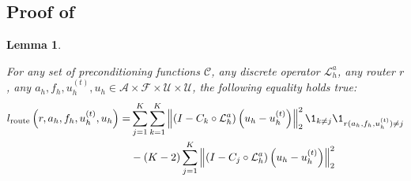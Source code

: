 \documentclass{article}
\newtheorem{lemma}[theorem]{Lemma}
\begin{document}
\subsection{Proof of } \label{sec:proofroutingequivalence}

\begin{lemma} \label{th:routingequivalence}

For any set of preconditioning functions $\mathcal{C}$, any discrete operator $\mathcal{L}_h^a$, any router $r$, any $a_h, f_h, u_h^{(t)}, u_h \in \mathcal{A} \times \mathcal{F} \times \mathcal{U} \times \mathcal{U}$, the following equality holds true:
\begin{align*}
     l_{\text{route}}\left(r, a_h, f_h, u^{(t)}_h, u_h\right) = &\sum_{j = 1}^K \sum_{k = 1}^K\left\|\left( I - C_{k} \circ \mathcal{L}_{h}^a\right)\left(u_h - u^{(t)}_h\right)\right\|^2_2\1_{k\neq j}\1_{r(a_h, f_h, u^{(t)}_h) \neq j} \\
     &-\left(K - 2\right)\sum_{j = 1}^K\left\|\left( I - C_{j} \circ \mathcal{L}_{h}^a\right)\left(u_h - u^{(t)}_h\right)\right\|^2_2
\end{align*}
    
\end{lemma}
\end{document}
